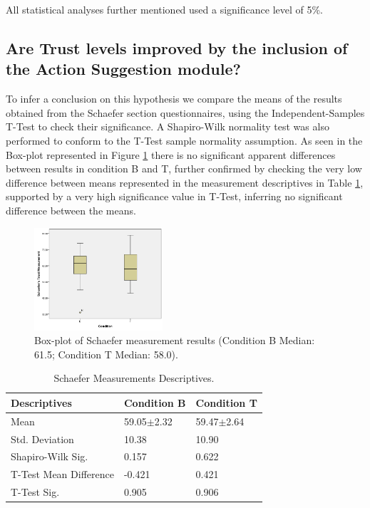 All statistical analyses further mentioned used a significance level of 5\%.

\subsection*{Are Trust levels improved by the inclusion of the Action Suggestion module?}
To infer a conclusion on this hypothesis we compare the means of the results obtained from the Schaefer section questionnaires, using the Independent-Samples T-Test to check their significance. A Shapiro-Wilk normality test was also performed to conform to the T-Test sample normality assumption.  As seen in the Box-plot represented in Figure \ref{fig:SchaeferMeasurementResults} there is no significant apparent differences between results in condition B and T, further confirmed by checking the very low difference between means represented in the measurement descriptives in Table \ref{tbl:SchaeferMeasurementsDescriptives}, supported by a very high significance value in T-Test, inferring no significant difference between the means.

\begin{figure}[hbt]
    \centering
    \includegraphics[width=180px]{graphs/Schaefer.png}
    \caption{Box-plot of Schaefer measurement results (Condition B Median: 61.5; Condition T Median: 58.0).}
    \label{fig:SchaeferMeasurementResults}
\end{figure}

\begin{table}[h]
    \centering
    \begin{tabular}{|l|l|l|}
        \hline
        \textbf{Descriptives}       &  \textbf{Condition B}     & \textbf{Condition T}  \\ \hline
        Mean                        &  59.05$\pm$2.32           & 59.47$\pm$2.64        \\ \hline
        Std. Deviation              &  10.38                    & 10.90                 \\ \hline
        Shapiro-Wilk Sig.           &  0.157                    & 0.622                 \\ \hline
        T-Test Mean Difference      &  -0.421                   & 0.421                 \\ \hline
        T-Test Sig.                 &  0.905                    & 0.906                 \\ \hline
    \end{tabular}
    \caption{Schaefer Measurements Descriptives.}
    \label{tbl:SchaeferMeasurementsDescriptives}
\end{table}

